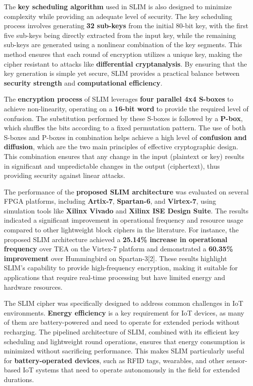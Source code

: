 \documentclass{article}
\begin{document}
The \textbf{key scheduling algorithm} used in SLIM is also designed to minimize complexity while providing an adequate level of security. The key scheduling process involves generating \textbf{32 sub-keys} from the initial 80-bit key, with the first five sub-keys being directly extracted from the input key, while the remaining sub-keys are generated using a nonlinear combination of the key segments. This method ensures that each round of encryption utilizes a unique key, making the cipher resistant to attacks like \textbf{differential cryptanalysis}. By ensuring that the key generation is simple yet secure, SLIM provides a practical balance between \textbf{security strength} and \textbf{computational efficiency}.

The \textbf{encryption process} of SLIM leverages \textbf{four parallel 4x4 S-boxes} to achieve non-linearity, operating on a \textbf{16-bit word} to provide the required level of confusion. The substitution performed by these S-boxes is followed by a \textbf{P-box}, which shuffles the bits according to a fixed permutation pattern. The use of both S-boxes and P-boxes in combination helps achieve a high level of \textbf{confusion and diffusion}, which are the two main principles of effective cryptographic design. This combination ensures that any change in the input (plaintext or key) results in significant and unpredictable changes in the output (ciphertext), thus providing security against linear attacks.

The performance of the \textbf{proposed SLIM architecture} was evaluated on several FPGA platforms, including \textbf{Artix-7}, \textbf{Spartan-6}, and \textbf{Virtex-7}, using simulation tools like \textbf{Xilinx Vivado} and \textbf{Xilinx ISE Design Suite}. The results indicated a significant improvement in operational frequency and resource usage compared to other lightweight block ciphers in the literature. For instance, the proposed SLIM architecture achieved a \textbf{25.14\% increase in operational frequency} over TEA on the Virtex-7 platform and demonstrated a \textbf{60.35\% improvement} over Hummingbird on Spartan-3[2]. These results highlight SLIM's capability to provide high-frequency encryption, making it suitable for applications that require real-time processing but have limited energy and hardware resources.

The SLIM cipher was specifically designed to address common challenges in IoT environments. \textbf{Energy efficiency} is a key requirement for IoT devices, as many of them are battery-powered and need to operate for extended periods without recharging. The pipelined architecture of SLIM, combined with its efficient key scheduling and lightweight round operations, ensures that energy consumption is minimized without sacrificing performance. This makes SLIM particularly useful for \textbf{battery-operated devices}, such as RFID tags, wearables, and other sensor-based IoT systems that need to operate autonomously in the field for extended durations.
\end{document}
